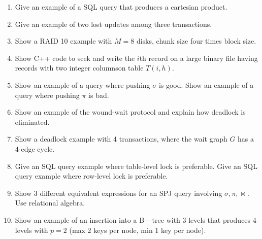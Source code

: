\begin{enumerate}
\item Give an example of a SQL query that produces a cartesian product.

\item Give an example of two lost updates among three transactions.

\item Show a RAID 10 example with $M=8$ disks, chunk size four times block size.

\item Show C++ code to seek and write the $i$th record on a large binary file
having records with two integer columnson table  $T(i,h)$.

\item Show an example of a query where pushing $\sigma$ is good.
Show an example of a query where pushing $\pi$ is bad.

\item Show an example of the wound-wait protocol and explain how deadlock is eliminated.

\item Show a deadlock example with 4 transactions, where the wait graph $G$ has a 4-edge cycle.

\item Give an SQL query example where table-level lock is preferable.
Give an SQL query example where row-level lock is preferable.

\item Show 3 different equivalent expressions for an SPJ query involving
$\sigma,\pi,\Join$. Use relational algebra.

\item Show an example of an insertion into a B+-tree with 3 levels
that produces 4 levels with $p=2$ (max 2 keys per node, min 1 key per node).

\end{enumerate}



